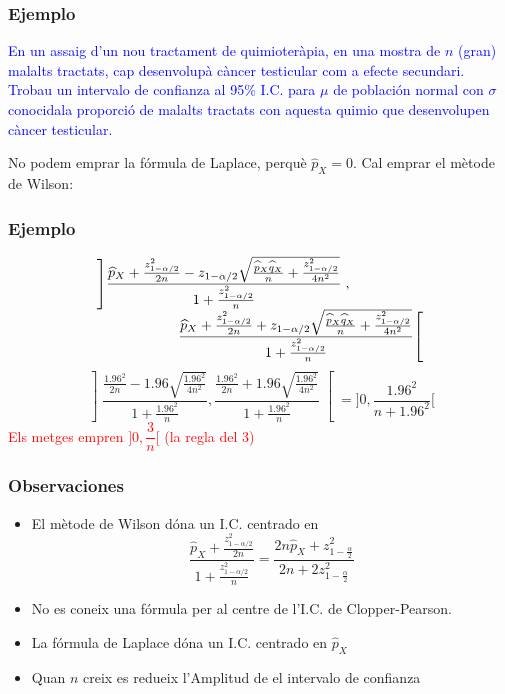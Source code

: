 \documentclass[12pt,t]{beamer}\usepackage[]{graphicx}\usepackage[]{color}
\newcommand{\red}[1]{\textcolor{red}{#1}}
\newcommand{\blue}[1]{\textcolor{blue}{#1}}
\theoremstyle{plain}
\theoremstyle{definition}
\begin{document}
\begin{frame}
\frametitle{Ejemplo}

\blue{En un assaig d'un nou tractament de quimioteràpia, en una mostra de $n$ (gran) malalts tractats, cap desenvolupà càncer testicular com a efecte secundari. Trobau un intervalo de confianza  al 95\% I.C. para $\mu$ de población normal con $\sigma$ conocidala proporció de malalts tractats con aquesta quimio que desenvolupen càncer testicular.}
\pause\bigskip

No podem emprar la fórmula de Laplace, perquè $\widehat{p}_X=0$. Cal emprar el mètode de Wilson:


\end{frame}

\begin{frame}
\frametitle{Ejemplo}
\vspace*{-5ex}

{\small
$$
\begin{array}{l}
\displaystyle \left]\frac{\widehat{p}_{X}+\frac{z_{1-{\alpha}/{2}}^2}{2n}-z_{1-{\alpha}/{2}}\sqrt{\frac{\widehat{p}_{X}\widehat{q}_{X}}{n}+\frac{z_{1-{\alpha}/{2}}^2}{4n^2}}}{1+\frac{z_{1-{\alpha}/{2}}^2}{n}}\right.,\\[2ex]
\hspace*{2cm} \displaystyle \left.\frac{\widehat{p}_{X}+\frac{z_{1-{\alpha}/{2}}^2}{2n}+z_{1-{\alpha}/{2}}\sqrt{\frac{\widehat{p}_{X}\widehat{q}_{X}}{n}+\frac{z_{1-{\alpha}/{2}}^2}{4n^2}}}{1+\frac{z_{1-{\alpha}/{2}}^2}{n}}\right[
\end{array}
$$
\pause
$$
\left]\frac{\frac{1.96^2}{2n}- 1.96\sqrt{\frac{1.96^2}{4n^2}}}{1+\frac{1.96^2}{n}},
\frac{\frac{1.96^2}{2n}+ 1.96\sqrt{\frac{1.96^2}{4n^2}}}{1+\frac{1.96^2}{n}}\right[
=\Big]0,\frac{1.96^2}{n+1.96^2}\Big[
$$
}
\red{Els metges empren $\Big]0,\dfrac{3}{n}\Big[$ (la regla del 3)}


\end{frame}


\begin{frame}
\frametitle{Observaciones }
\begin{itemize}
\item El mètode de Wilson dóna un I.C. centrado   en
$$
\frac{\widehat{p}_{X}+\frac{z_{1-{\alpha}/{2}}^2}{2n}}{1+\frac{z_{1-{\alpha}/{2}}^2}{n}}
=\frac{2n\widehat{p}_{X}+ z_{1-\frac{\alpha}{2}}^2}{2n+2 z_{1-\frac{\alpha}{2}}^2}
$$

\item No es coneix una fórmula per al centre de l'I.C. de Clopper-Pearson.

\item La fórmula de Laplace dóna un I.C.  centrado   en $\widehat{p}_{X}$
\medskip

\item Quan $n$ creix es redueix l'Amplitud de el intervalo de confianza 

\end{itemize}

\end{frame}
\end{document}
